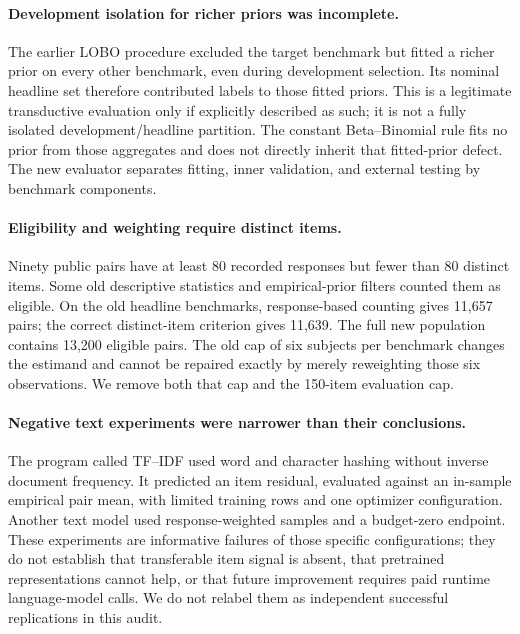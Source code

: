 \documentclass{article}
\begin{document}
\paragraph{Development isolation for richer priors was incomplete.}
The earlier LOBO procedure excluded the target benchmark but fitted a richer
prior on every other benchmark, even during development selection. Its
nominal headline set therefore contributed labels to those fitted priors.
This is a legitimate transductive evaluation only if explicitly described
as such; it is not a fully isolated development/headline partition. The
constant Beta--Binomial rule fits no prior from those aggregates and does
not directly inherit that fitted-prior defect. The new evaluator separates
fitting, inner validation, and external testing by benchmark components.

\paragraph{Eligibility and weighting require distinct items.}
Ninety public pairs have at least 80 recorded responses but fewer than
80 distinct items. Some old descriptive statistics and empirical-prior filters
counted them as eligible. On the old headline benchmarks, response-based
counting gives 11,657 pairs; the correct distinct-item criterion gives
11,639. The full new population contains 13,200 eligible pairs. The old
cap of six subjects per benchmark changes the estimand and cannot be repaired
exactly by merely reweighting those six observations. We remove both that cap
and the 150-item evaluation cap.

\paragraph{Negative text experiments were narrower than their conclusions.}
The program called TF--IDF used word and character hashing without inverse
document frequency. It predicted an item residual, evaluated against an
in-sample empirical pair mean, with limited training rows and one optimizer
configuration. Another text model used response-weighted samples and a
budget-zero endpoint. These experiments are informative failures of those
specific configurations; they do not establish that transferable item signal
is absent, that pretrained representations cannot help, or that future
improvement requires paid runtime language-model calls. We do not relabel
them as independent successful replications in this audit.
\end{document}
